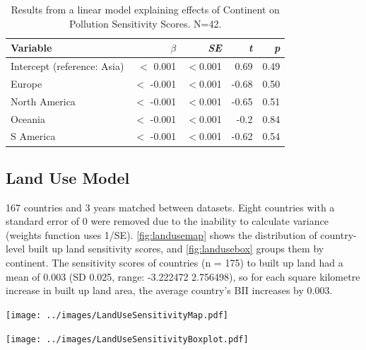 \documentclass[11pt, a4paper, titlepage]{article}
\begin{document}
		\begin{table}[h!]
		\begin{center}
			\caption{Results from a linear model explaining effects of Continent on Pollution Sensitivity Scores. \textmd{ N=42.}}
			\label{tab:pollution}
			\begin{tabular}{l|r|r|r|r} %
				Variable & $\beta$ & \textit{SE} & \textit{t} & \textit{p}\\
				\hline
				Intercept (reference: Asia) & $<$ 0.001 & $<$0.001 & 0.69 & 0.49\\
				Europe & $<$ -0.001 & $<$0.001 & -0.68 & 0.50 \\
				North America & $<$ -0.001 & $<$0.001 & -0.65 & 0.51\\
				Oceania & $<$ -0.001 & $<$0.001 & -0.2 & 0.84\\
				S America & $<$ -0.001 & $<$0.001 & -0.62 & 0.54\\
			\end{tabular}
		\end{center}
	\end{table}

\newpage
	\subsection*{Land Use Model}
	
	167 countries and 3 years matched between datasets. Eight countries with a standard error of 0 were removed due to the inability to calculate variance (weights function uses 1/SE).  \autoref{fig:landusemap} shows the distribution of country-level built up land sensitivity scores, and \autoref{fig:landusebox} groups them by continent. The sensitivity scores of countries (n = 175) to built up land had a mean of 0.003 (SD 0.025, range: -3.222472  2.756498), so for each square kilometre increase in built up land area, the average country's BII increases by 0.003.
	
	\texttt{[image: ../images/LandUseSensitivityMap.pdf]}
	\label{fig:landusemap}
	
	\texttt{[image: ../images/LandUseSensitivityBoxplot.pdf]}
    \label{fig:landusebox}
    
\end{document}
